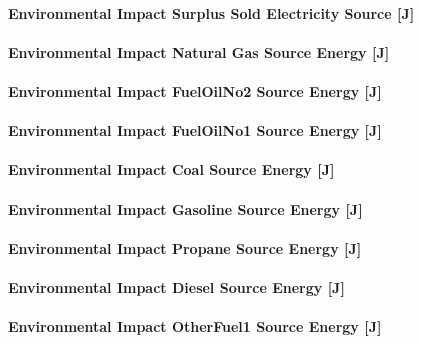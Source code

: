 \paragraph{Environmental Impact Surplus Sold Electricity Source {[}J{]}}\label{environmental-impact-surplus-sold-electricity-source-j}

\paragraph{Environmental Impact Natural Gas Source Energy {[}J{]}}\label{environmental-impact-natural-gas-source-energy-j}

\paragraph{Environmental Impact FuelOilNo2 Source Energy {[}J{]}}\label{environmental-impact-fuel-oil-2-source-energy-j}

\paragraph{Environmental Impact FuelOilNo1 Source Energy {[}J{]}}\label{environmental-impact-fuel-oil-1-source-energy-j}

\paragraph{Environmental Impact Coal Source Energy {[}J{]}}\label{environmental-impact-coal-source-energy-j}

\paragraph{Environmental Impact Gasoline Source Energy {[}J{]}}\label{environmental-impact-gasoline-source-energy-j}

\paragraph{Environmental Impact Propane Source Energy {[}J{]}}\label{environmental-impact-propane-source-energy-j}

\paragraph{Environmental Impact Diesel Source Energy {[}J{]}}\label{environmental-impact-diesel-source-energy-j}

\paragraph{Environmental Impact OtherFuel1 Source Energy {[}J{]}}\label{environmental-impact-otherfuel1-source-energy-j}

